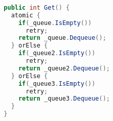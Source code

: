 \begin{lstlisting}[label=lst:stm_orelse,
  caption={Queue with orElse},
  language=Java,  
  showspaces=false,
  showtabs=false,
  breaklines=true,
  showstringspaces=false,
  breakatwhitespace=true,
  commentstyle=\color{greencomments},
  keywordstyle=\color{bluekeywords},
  stringstyle=\color{redstrings},
  morekeywords={atomic, retry, orElse}]  % Start your code-block
  
  public int Get() {
    atomic {
      if(_queue.IsEmpty())
        retry;
      return _queue.Dequeue();
    } orElse {
      if(_queue2.IsEmpty())
        retry;
      return _queue2.Dequeue();
    } orElse {
      if(_queue3.IsEmpty())
        retry;
      return _queue3.Dequeue();
    }
  }
\end{lstlisting}

%
\worksheetend